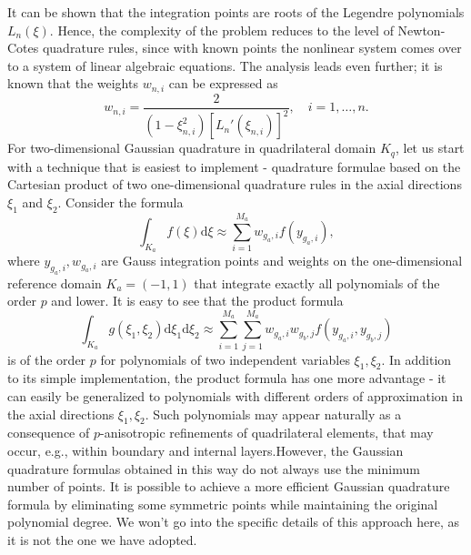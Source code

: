 \documentclass{develop-note}
\begin{document}
It can be shown that the integration points are roots of the Legendre polynomials $L_{n}(\xi)$. Hence, the complexity of the problem reduces to the level of Newton-Cotes quadrature rules, since with known points the nonlinear system comes over to a system of linear algebraic equations. The analysis leads even further; it is known that the weights $w_{n,i}$ can be expressed as
\begin{equation}
  w_{n,i}=\dfrac{2}{(1-\xi_{n,i}^{2})[L_{n}'(\xi_{n,i})]^{2}}, \quad i=1,\dots,n.
\end{equation}
For two-dimensional Gaussian quadrature in quadrilateral domain $K_{q}$, let us start with a technique that is easiest to implement - quadrature formulae based on the Cartesian product of two one-dimensional quadrature rules in the axial directions $\xi_{1}$ and $\xi_{2}$. Consider the formula
\begin{equation}
  \int_{K_{a}}f(\xi)\mathrm{d}\xi\approx\sum_{i=1}^{M_{a}}w_{g_{a},i}f(y_{g_{a},i}),
\end{equation}
where $y_{g_{a},i},w_{g_{a},i}$ are Gauss integration points and weights on the one-dimensional reference domain $K_{a}=(-1,1)$ that integrate exactly all polynomials of the order $p$ and lower. It is easy to see that the product formula
\begin{equation}
  \int_{K_{a}}g(\xi_{1},\xi_{2})\mathrm{d}\xi_{1}\mathrm{d}\xi_{2}\approx\sum_{i=1}^{M_{a}}\sum_{j=1}^{M_{a}}w_{g_{a},i}w_{g_{b},j}f(y_{g_{a},i},y_{g_{b},j})
\end{equation}
is of the order $p$ for polynomials of two independent variables $\xi_{1},\xi_{2}$. In addition to its simple implementation, the product formula has one more advantage - it can easily be generalized to polynomials with different orders of approximation in the axial directions $\xi_{1},\xi_{2}$. Such polynomials may appear naturally as a consequence of $p$-anisotropic refinements of quadrilateral elements, that may occur, e.g., within boundary and internal layers.However, the Gaussian quadrature formulas obtained in this way do not always use the minimum number of points. It is possible to achieve a more efficient Gaussian quadrature formula by eliminating some symmetric points while maintaining the original polynomial degree. We won't go into the specific details of this approach here, as it is not the one we have adopted.
\end{document}
